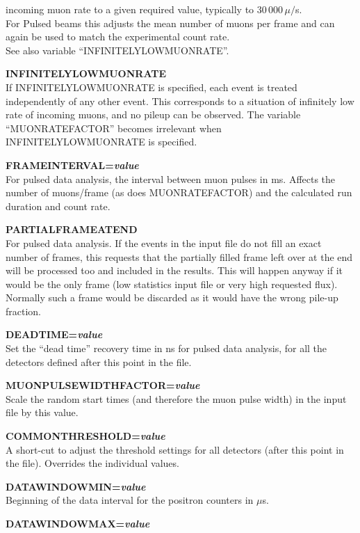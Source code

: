 \documentclass[twoside]{dis04}
\begin{document}
\begin{description}
	 incoming muon rate to a given required value, typically to 30\,000\,$\mu/$s.\\
	For Pulsed beams this adjusts the mean number of muons per frame and can again be used to match the experimental count rate.\\
	 See also variable ``INFINITELYLOWMUONRATE''.
   \item{\bf INFINITELYLOWMUONRATE} \\ 
         If INFINITELYLOWMUONRATE is specified, each event is treated independently of any other
         event.  This corresponds to a situation of infinitely low rate of incoming muons, and
         no pileup can be observed.  The variable ``MUONRATEFACTOR'' becomes irrelevant when
	 INFINITELYLOWMUONRATE is specified.
\item{\bf FRAMEINTERVAL=\emph{value}} \\
	For pulsed data analysis, the interval between muon pulses in ms. Affects the number of muons/frame (as does MUONRATEFACTOR) and the calculated run duration and count rate.
\item{\bf PARTIALFRAMEATEND} \\
	For pulsed data analysis. If the events in the input file do not fill an exact number of frames, this requests that the partially filled frame left over at the end will be processed too and included in the results.
	This will happen anyway if it would be the only frame (low statistics input file or very high requested flux). Normally such a frame would be discarded as it would have the wrong pile-up fraction.
\item{\bf DEADTIME=\emph{value}} \\
	Set the ``dead time'' recovery time in ns for pulsed data analysis, for all the detectors defined after this point in the file.
   \item{\bf MUONPULSEWIDTHFACTOR=\emph{value}} \\ 
	Scale the random start times (and therefore the muon pulse width) in the input file by this value.
\item{\bf COMMONTHRESHOLD=\emph{value}} \\
	A short-cut to adjust the threshold settings for all detectors (after this point in the file). Overrides the individual values.
   \item{\bf DATAWINDOWMIN=\emph{value}} \\ 
         Beginning of the data interval for the positron counters in $\mu$s.
   \item{\bf DATAWINDOWMAX=\emph{value}} \\ 

\end{description}
\end{document}
